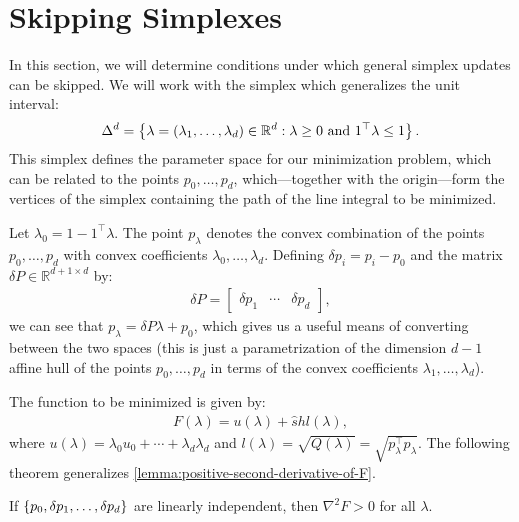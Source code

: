 \documentclass{article}
\begin{document}
\section{Skipping Simplexes}

In this section, we will determine conditions under which general
simplex updates can be skipped. We will work with the simplex which
generalizes the unit interval:
\begin{align*}
  \Delta^d = \left\{\lambda = (\lambda_1, \hdots, \lambda_d) \in \mathbb{R}^d : \lambda \geq 0 \mbox{ and } 1^\top \lambda \leq 1\right\}.
\end{align*}
This simplex defines the parameter space for our minimization problem,
which can be related to the points $p_0, \hdots, p_d$,
which---together with the origin---form the vertices of the simplex
containing the path of the line integral to be minimized.

Let $\lambda_0 = 1 - 1^\top \lambda$. The point $p_\lambda$ denotes
the convex combination of the points $p_0, \hdots, p_d$ with convex
coefficients $\lambda_0, \hdots, \lambda_d$. Defining
$\delta p_i = p_i - p_0$ and the matrix
$\delta P \in \mathbb{R}^{d + 1 \times d}$ by:
\begin{align*}
  \delta P = \begin{bmatrix} \delta p_1 & \cdots & \delta p_d \end{bmatrix},
\end{align*}
we can see that $p_\lambda = \delta P \lambda + p_0$, which gives us a
useful means of converting between the two spaces (this is just a
parametrization of the dimension $d - 1$ affine hull of the points
$p_0, \hdots, p_d$ in terms of the convex coefficients
$\lambda_1, \hdots, \lambda_d$).

The function to be minimized is
given by:
\begin{align*}
  F(\lambda) = u(\lambda) + \hat{s} h l(\lambda),
\end{align*}
where $u(\lambda) = \lambda_0 u_0 + \cdots + \lambda_d \lambda_d$ and
$l(\lambda) = \sqrt{Q(\lambda)} = \sqrt{p_\lambda^\top
  p_\lambda}$. The following theorem generalizes
\cref{lemma:positive-second-derivative-of-F}.

\begin{theorem}
  If $\left\{p_0, \delta p_1, \hdots, \delta p_d\right\}$ are linearly
  independent, then $\nabla^2 F > 0$ for all $\lambda$.
\end{theorem}
\end{document}
